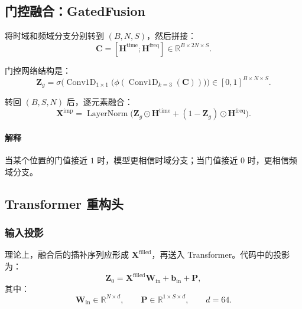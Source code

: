 \documentclass[UTF8]{ctexart}
\begin{document}
\subsection{门控融合：GatedFusion}

将时域和频域分支分别转到 $(B,N,S)$，然后拼接：
\begin{equation}
    \bm{C} = [\bm{H}^{\text{time}};\bm{H}^{\text{freq}}] \in \mathbb{R}^{B \times 2N \times S}.
\end{equation}

门控网络结构是：
\begin{equation}
    \bm{Z}_g
    =
    \sigma\!\Big(
        \operatorname{Conv1D}_{1\times 1}
        \big(
            \phi(\operatorname{Conv1D}_{k=3}(\bm{C}))
        \big)
    \Big)
    \in [0,1]^{B \times N \times S}.
\end{equation}

转回 $(B,S,N)$ 后，逐元素融合：
\begin{equation}
    \bm{X}^{\text{imp}}
    =
    \operatorname{LayerNorm}
    \big(
        \bm{Z}_g \odot \bm{H}^{\text{time}}
        +
        (1-\bm{Z}_g)\odot \bm{H}^{\text{freq}}
    \big).
\end{equation}

\paragraph{解释}
当某个位置的门值接近 $1$ 时，模型更相信时域分支；当门值接近 $0$ 时，更相信频域分支。

\subsection{Transformer 重构头}

\subsubsection{输入投影}

理论上，融合后的插补序列应形成 $\bm{X}^{\text{filled}}$，再送入 Transformer。代码中的投影为：
\begin{equation}
    \bm{Z}_0 = \bm{X}^{\text{filled}}\bm{W}_{\text{in}} + \bm{b}_{\text{in}} + \bm{P},
\end{equation}
其中：
\begin{equation}
    \bm{W}_{\text{in}} \in \mathbb{R}^{N \times d}, \qquad
    \bm{P} \in \mathbb{R}^{1 \times S \times d}, \qquad d=64.
\end{equation}
\end{document}
